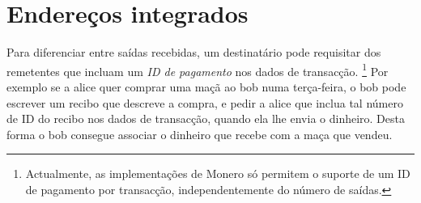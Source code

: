 \section{Endereços integrados}
\label{sec:integrated-addresses}

Para diferenciar entre saídas recebidas, um destinatário pode requisitar dos remetentes que incluam um {\em ID de pagamento} nos dados de transacção.
\footnote{Actualmente, as implementações de Monero só permitem o suporte de um ID de pagamento por transacção, independentemente do número de saídas.} 
Por exemplo se a alice quer comprar uma maçã ao bob numa terça-feira, o bob pode escrever um recibo que descreve a compra, e pedir a alice que inclua tal número de ID do recibo nos dados de transacção, quando ela lhe envia o dinheiro. Desta forma o bob consegue associar o dinheiro que recebe com a maça que vendeu.

